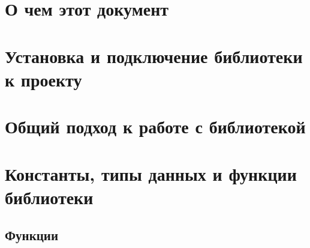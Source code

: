 \documentclass[12pt,a4paper,titlepage]{report}
\begin{document}
  \newpage  
  
  \tableofcontents
  

\chapter{О чем этот документ}

\chapter{Установка и подключение библиотеки к проекту}

\chapter{Общий подход к работе с библиотекой}


  
\chapter{Константы, типы данных и функции библиотеки}



%
%
%
\section{Функции}











\end{document}
